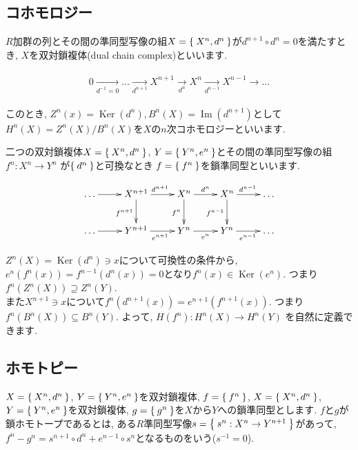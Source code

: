 \documentclass{jsarticle}
\newcommand{\makeop}[1]{\mathop{\mathrm{#1}}\nolimits}
\def\Im{\makeop{Im}}
\def\Ker{\makeop{Ker}}
\theoremstyle{definition}
\numberwithin{theorem}{section}
\begin{document}
\subsection{コホモロジー}
$R$加群の列とその間の準同型写像の組$X = \Set{X^n, d^n}$が$d^{n+1} \circ d^n = 0$を満たすとき, $X$を双対鎖複体(dual chain complex)といいます.

\begin{eqnarray*}
\begin{aligned}
0 \xrightarrow[d^{-1} = 0]{} \ldots \xrightarrow[d^{n+1}]{} X^{n+1} \xrightarrow[d^n]{} X^n \xrightarrow[d^{n-1}]{} X^{n-1} \rightarrow \ldots
\end{aligned}
\end{eqnarray*}

このとき, $Z^n(x) = \Ker(d^n), B^n(X) = \Im(d^{n+1})$として$H^n(X) = Z^n(X)/B^n(X)$を$X$の$n$次コホモロジーといいます.

二つの双対鎖複体$X = \Set{X^n, d^n}$, $Y = \Set{Y^n, e^n}$とその間の準同型写像の組$f^n:X^n \rightarrow Y^n$
が$\Set{d^n}$と可換なとき $f = \Set{f^n}$を鎖準同型といいます.

\begin{equation*}
\xymatrix{
  \ldots \ar[r] & X^{n+1} \ar[r]^{d^{n+1}} \ar[d]_{f^{n+1}} & X^{n} \ar[r]^{d^n} \ar[d]_{f^{n}} & X^n \ar[r]^{d^{n-1}} \ar[d]_{f^{n-1}} & \ldots\\
  \ldots \ar[r] & Y^{n+1} \ar[r]_{e^{n+1}} & Y^{n} \ar[r]_{e^n} & Y^n \ar[r]_{e^{n-1}} & \ldots\\
}
\end{equation*}

$Z^n(X) = \Ker(d^n)\ni x$について可換性の条件から, $e^n(f^n(x)) = f^{n-1}(d^n(x)) = 0$となり$f^n(x) \in \Ker(e^n)$. つまり
$f^n(Z^n(X))\supseteq Z^n(Y)$.\\
また$X^{n+1}\ni x$について$f^n(d^{n+1}(x)) = e^{n+1}(f^{n+1}(x))$. つまり$f^n(B^n(X))\subseteq B^n(Y)$. よって, 
$H(f^n): H^n(X) \rightarrow H^n(Y)$ を自然に定義できます.

\subsection{ホモトピー}
\label{sc:homotopy}
$X=\Set{X^n, d^n}$, $Y = \Set{Y^n, e^n}$を双対鎖複体, $f=\Set{f^n}$, $X=\Set{X^n, d^n}$, $Y = \Set{Y^n, e^n}$を双対鎖複体,
$g=\Set{g^n}$を$X$から$Y$への鎖準同型とします. $f$と$g$が鎖ホモトープであるとは, ある$R$準同型写像$s=\Set{s^n: X^n\rightarrow Y^{n+1}}$があって, 
$f^n-g^n = s^{n+1} \circ d^n+e^{n-1} \circ s^n$となるものをいう($s^{-1} = 0$).
\end{document}
